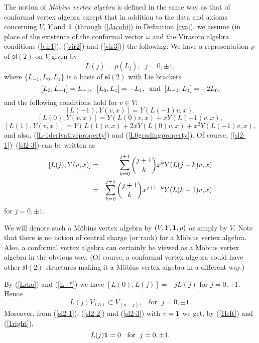 \documentclass[12pt]{article}
\begin{document}
\begin{defi}\label{mobdef}{\rm
The notion of {\it M\"obius vertex algebra} is defined in the same way
as that of conformal vertex algebra except that in addition to the
data and axioms concerning $V$, $Y$ and ${\bf 1}$ (through
(\ref{Jacobi}) in Definition \ref{cva}), we assume (in place of
the existence of the conformal vector $\omega$ and the Virasoro
algebra conditions (\ref{vir1}), (\ref{vir2}) and (\ref{vir3})) the
following: We have a representation $\rho$ of ${\mathfrak s}{\mathfrak l}(2)$
on $V$ given by
\begin{equation}\label{Lrho}
L(j)=\rho(L_j),\;\;j=0,\pm 1,
\end{equation}
where $\{L_{-1}, L_0, L_1\}$ is a basis of ${\mathfrak s}{\mathfrak l}(2)$
with Lie brackets
\begin{equation}\label{L_*}
[L_0, L_{-1}]=L_{-1},\;\;[L_0,L_1]=-L_1,{\rm\;\;and\;\;}
[L_{-1},L_1]=-2L_0,
\end{equation}
and the following conditions hold for $v \in V$:
\begin{equation}\label{sl2-1}
[L(-1), Y(v,x)]=Y(L(-1)v,x),
\end{equation}
\begin{equation}\label{sl2-2}
[L(0), Y(v,x)]=Y(L(0)v,x)+xY(L(-1)v,x),
\end{equation}
\begin{equation}\label{sl2-3}
[L(1),Y(v,x)]=Y(L(1)v,x)+2xY(L(0)v,x)+x^2Y(L(-1)v,x),
\end{equation}
and also, (\ref{L-1derivativeproperty}) and
(\ref{L0gradingproperty}).  Of course, (\ref{sl2-1})--(\ref{sl2-3})
can be written as
\begin{eqnarray}\label{sl2-all}
[L(j),Y(v,x)]&=&\sum_{k=0}^{j+1}{j+1\choose k}x^kY(L(j-k)v,x)\nonumber\\
&=&\sum_{k=0}^{j+1}{j+1\choose k}x^{j+1-k}Y(L(k-1)v,x)
\end{eqnarray}
for $j=0,\pm 1$.}
\end{defi}

We will denote such a M\"obius vertex algebra by $(V,Y,{\bf 1}, \rho)$
or simply by $V$. Note that there is no notion of central charge (or
rank) for a M\"obius vertex algebra.  Also, a conformal vertex algebra
can certainly be viewed as a M\"obius vertex algebra in the obvious
way.  (Of course, a conformal vertex algebra could have other ${\mathfrak
s}{\mathfrak l}(2)$-structures making it a M\"obius vertex algebra in a
different way.)

\begin{rema}{\rm
By (\ref{Lrho}) and (\ref{L_*}) we have $[L(0), L(j)]=-jL(j)$ for
$j=0,\pm 1$. Hence
\begin{equation}\label{degL(j)}
L(j)V_{(n)}\subset V_{(n-j)},\;\; \mbox{ for }\;j=0,\pm1.
\end{equation}
Moreover, {}from (\ref{sl2-1}), (\ref{sl2-2}) and (\ref{sl2-3}) with
$v={\bf 1}$ we get, by (\ref{1left}) and (\ref{1right}),
\[
L(j){\bf 1}=0\;\; \mbox{ for } \; j=0,\pm 1.
\]
}
\end{rema}
\end{document}
